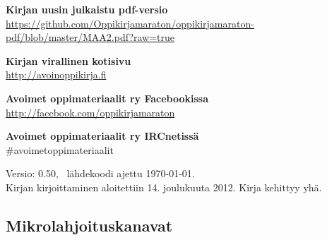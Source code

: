 \textbf{Kirjan uusin julkaistu pdf-versio} \\
\url{https://github.com/Oppikirjamaraton/oppikirjamaraton-pdf/blob/master/MAA2.pdf?raw=true}

\textbf{Kirjan virallinen kotisivu} \\
\url{http://avoinoppikirja.fi}

\textbf{Avoimet oppimateriaalit ry Facebookissa} \\
\url{http://facebook.com/oppikirjamaraton}

\textbf{Avoimet oppimateriaalit ry IRCnetissä} \\
\#avoimetoppimateriaalit

Versio: 0.50, \, lähdekoodi ajettu \today. \\
Kirjan kirjoittaminen aloitettiin 14. joulukuuta 2012. Kirja kehittyy yhä.

\subsection*{Mikrolahjoituskanavat}



